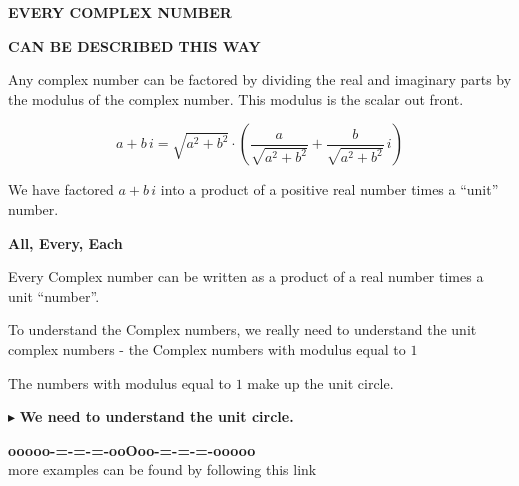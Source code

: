 \documentclass{ximera}
\begin{document}
\begin{center}

\textbf{\textcolor{purple!50!blue!90!black}{EVERY COMPLEX NUMBER}}

\textbf{\textcolor{purple!50!blue!90!black}{CAN BE DESCRIBED THIS WAY}}

\end{center}




Any complex number can be factored by dividing the real and imaginary parts by the modulus of the complex number.  This modulus is the scalar out front.




\[     a + b \, i    =  \sqrt{a^2 + b^2}  \cdot \left(  \frac{a}{\sqrt{a^2 + b^2}} + \frac{b}{\sqrt{a^2 + b^2}} \, i \right)                      \]


We have factored $a + b \, i $ into a product of a positive real number times a ``unit'' number. 

















\begin{summary} \textbf{\textcolor{red!70!yellow}{All, Every, Each}}  

Every Complex number can be written as a product of a real number times a unit ``number''.


To understand the Complex numbers, we really need to understand the unit complex numbers - the Complex numbers with modulus equal to $1$


The numbers with modulus equal to $1$ make up the unit circle.


$\blacktriangleright$ \textbf{\textcolor{blue!55!black}{We need to understand the unit circle.}}   

\end{summary}
































\begin{center}
\textbf{\textcolor{green!50!black}{ooooo-=-=-=-ooOoo-=-=-=-ooooo}} \\

more examples can be found by following this link\\ 

\end{center}
\end{document}
